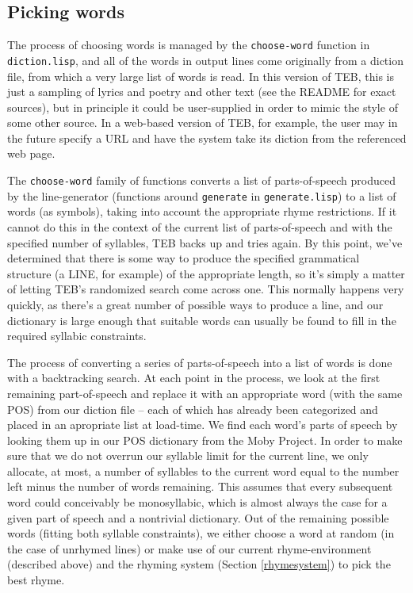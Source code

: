 \documentclass[12pt]{article}
\begin{document}
\subsection{Picking words}
The process of choosing words is managed by the \verb+choose-word+ function
in \verb+diction.lisp+, and all of the words in output lines come
originally from a diction file, from which a very large list of words is
read. In this version of TEB, this is just a sampling of lyrics and poetry
and other text (see the README for exact sources), but in principle it
could be user-supplied in order to mimic the style of some other source. In
a web-based version of TEB, for example, the user may in the future specify
a URL and have the system take its diction from the referenced web page.

\bigskip
The \verb+choose-word+ family of functions converts a list of
parts-of-speech produced by the line-generator (functions around
\verb+generate+ in \verb+generate.lisp+) to a list of words (as symbols),
taking into account the appropriate rhyme restrictions. If it cannot do
this in the context of the current list of parts-of-speech and with the
specified number of syllables, TEB backs up and tries again. By this point,
we've determined that there is some way to produce the specified
grammatical structure (a LINE, for example) of the appropriate length, so
it's simply a matter of letting TEB's randomized search come across one.
This normally happens very quickly, as there's a great number of possible
ways to produce a line, and our dictionary is large enough that suitable
words can usually be found to fill in the required syllabic constraints.

\bigskip
The process of converting a series of parts-of-speech into a list of words
is done with a backtracking search. At each point in the process, we look
at the first remaining part-of-speech and replace it with an appropriate
word (with the same POS) from our diction file -- each of which has already
been categorized and placed in an apropriate list at load-time. We find
each word's parts of speech by looking them up in our POS dictionary from
the Moby Project\cite{moby}. In order to make sure that we do not overrun
our syllable limit for the current line, we only allocate, at most, a
number of syllables to the current word equal to the number left minus the
number of words remaining. This assumes that every subsequent word could
conceivably be monosyllabic, which is almost always the case for a given
part of speech and a nontrivial dictionary. Out of the remaining possible
words (fitting both syllable constraints), we either choose a word at
random (in the case of unrhymed lines) or make use of our current
rhyme-environment (described above) and the rhyming system (Section
\ref{rhymesystem}) to pick the best rhyme.
\end{document}

